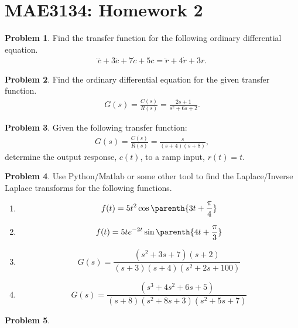 \documentclass[10pt]{article}
\date{}
\theoremstyle{definition}
\newtheorem{prob}{Problem}[section]
\newenvironment{subprob}%
{\renewcommand{\theenumi}{\alph{enumi}}\renewcommand{\labelenumi}{(\theenumi)}\begin{enumerate}}%
{\end{enumerate}}%
\begin{document}
\pagestyle{empty}
\section*{MAE3134: Homework 2}
\vspace*{-0.4cm}


\begin{prob}
    Find the transfer function for the following ordinary differential equation.
    \begin{align*}
        \dddot{c} + 3 \ddot{c} + 7 \dot{c} + 5 c = \ddot{r} + 4 \dot{r} + 3 r.
    \end{align*}
\end{prob}

\begin{prob}
    Find the ordinary differential equation for the given transfer function.
    \begin{align*}
        G(s) = \frac{C(s)}{R(s)} = \frac{2 s + 1}{s^2 + 6s + 2}.
    \end{align*}
\end{prob}

\begin{prob}
    Given the following transfer function:
    \begin{align*}
        G(s) = \frac{C(s)}{R(s)} = \frac{s}{(s +4)(s+8)} ,
    \end{align*}
    determine the output response, \( c(t) \), to a ramp input, \( r(t) = t \).
\end{prob}

\begin{prob}
    Use Python/Matlab or some other tool to find the Laplace/Inverse Laplace transforms for the following functions.

    \begin{subprob}
        \item \[ f(t) = 5 t^2 \cos \parenth{3 t + \frac{\pi}{4}} \]
        \item \[ f(t) = 5 t e^{-2t} \sin \parenth{4t + \frac{\pi}{3}}\]
        \item \[ G(s) = \frac{(s^2+3s+7)(s+2)}{(s+3)(s+4)(s^2+2s+100)}\]
        \item \[ G(s) = \frac{(s^3 + 4s^2 + 6s +5)}{(s+8)(s^2 + 8s+3)(s^2 + 5s+7)}\]
    \end{subprob}
\end{prob}

\begin{prob}
\end{prob}
\end{document}
